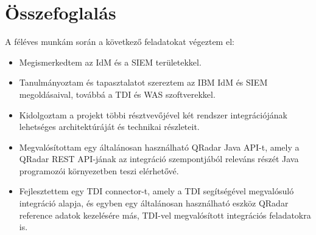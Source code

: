 \chapter{Összefoglalás}
\label{ch:sum}
A féléves munkám során a következő feladatokat végeztem el:

\begin{itemize}
	\item Megismerkedtem az IdM és a SIEM területekkel.
	\item Tanulmányoztam és tapasztalatot szereztem az IBM IdM és SIEM megoldásaival, továbbá a TDI és WAS szoftverekkel.
	\item Kidolgoztam a projekt többi résztvevőjével két rendszer integrációjának lehetséges architektúráját és technikai részleteit.
	\item Megvalósítottam egy általánosan használható QRadar Java API-t, amely a QRadar REST API-jának az integráció szempontjából releváns részét Java programozói környezetben teszi elérhetővé.
	\item Fejlesztettem egy TDI connector-t, amely a TDI segítségével megvalósuló integráció alapja, és egyben egy általánosan használható eszköz QRadar reference adatok kezelésére más, TDI-vel megvalósított integrációs feladatokra is.
\end{itemize}
